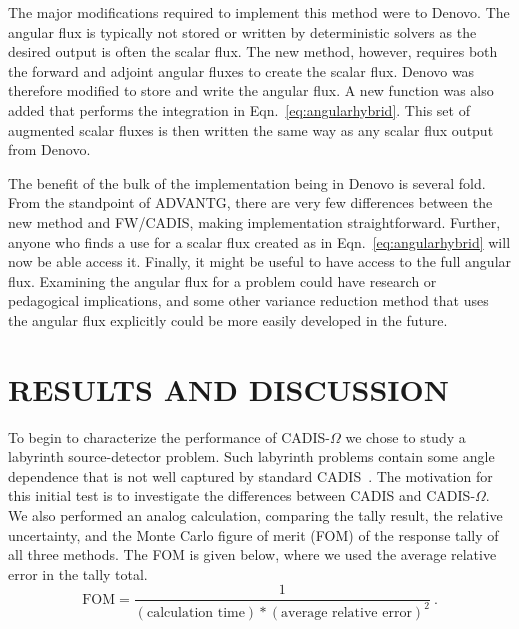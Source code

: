 \documentclass[12pt]{article}
\begin{document}

The major modifications required to implement this method were to Denovo. 
The angular flux is typically not stored or written by deterministic solvers as the desired output is often the scalar flux.
The new method, however, requires both the forward and adjoint angular fluxes to create the scalar flux. 
Denovo was therefore modified to store and write the angular flux.
A new function was also added that performs the integration in Eqn.~\eqref{eq:angularhybrid}. 
This set of augmented scalar fluxes is then written the same way as any scalar flux output from Denovo.

The benefit of the bulk of the implementation being in Denovo is several fold. 
From the standpoint of ADVANTG, there are very few differences between the new method and FW/CADIS, making implementation straightforward.
Further, anyone who finds a use for a scalar flux created as in Eqn.~\eqref{eq:angularhybrid} will now be able  access it.
Finally, it might be useful to have access to the full angular flux. 
Examining the angular flux for a problem could have research or pedagogical implications, and some other variance reduction method that uses the angular flux explicitly could be more easily developed in the future.

%
\section{RESULTS AND DISCUSSION} 
\label{sect::results}


To begin to characterize the performance of CADIS-$\Omega$ we chose to study a labyrinth source-detector problem.
Such labyrinth problems contain some angle dependence that is not well captured by standard CADIS~\cite{Peplow-ORNL}. 
The motivation for this initial test is to investigate the differences between CADIS and CADIS-$\Omega$.
We also performed an analog calculation, comparing  the tally result, the relative uncertainty, and the Monte Carlo figure of merit (FOM) of the response tally of all three methods.
The FOM is given below, where we used the average relative error in the tally total.
%
\[\text{FOM} = \frac{1}{(\text{calculation time})*(\text{average relative error})^2}\:. \]
\end{document}
